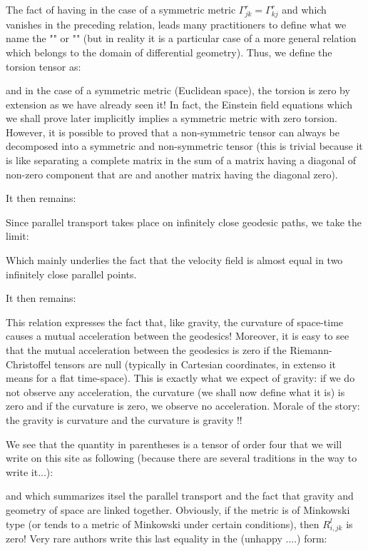 	\begin{tcolorbox}[title=Remark,colframe=black,arc=10pt]
	The fact of having in the case of a symmetric metric $\Gamma_{jk}^r=\Gamma_{kj}^r$ and which vanishes in the preceding relation, leads many practitioners to define what we name the "" or "" (but in reality it is a particular case of a more general relation which belongs to the domain of differential geometry). Thus, we define the torsion tensor as:
	
	and in the case of a symmetric metric (Euclidean space), the torsion is zero by extension as we have already seen it! In fact, the Einstein field equations which we shall prove later implicitly implies a symmetric metric with zero torsion. However, it is possible to proved that a non-symmetric tensor can always be decomposed into a symmetric and non-symmetric tensor (this is trivial because it is like separating a complete matrix in the sum of a matrix having a diagonal of non-zero component that are and another matrix having the diagonal zero).
	\end{tcolorbox}
	It then remains:
	
	Since parallel transport takes place on infinitely close geodesic paths, we take the limit:
	
	Which mainly underlies the fact that the velocity field is almost equal in two infinitely close parallel points.

	It then remains:
	
	This relation expresses the fact that, like gravity, the curvature of space-time causes a mutual acceleration between the geodesics! Moreover, it is easy to see that the mutual acceleration between the geodesics is zero if the Riemann-Christoffel tensors are null (typically in Cartesian coordinates, in extenso it means for a flat time-space). This is exactly what we expect of gravity: if we do not observe any acceleration, the curvature (we shall now define what it is) is zero and if the curvature is zero, we observe no acceleration. Morale of the story: the gravity is curvature and the curvature is gravity !!

	We see that the quantity in parentheses is a tensor of order four that we will write on this site as following (because there are several traditions in the way to write it...):
	
	and which summarizes itsel the parallel transport and the fact that gravity and geometry of space are linked together. Obviously, if the metric is of Minkowski type (or tends to a metric of Minkowski under certain conditions), then $R_{i,jk}^l$ is zero! Very rare authors write this last equality in the (unhappy ....) form:
	
